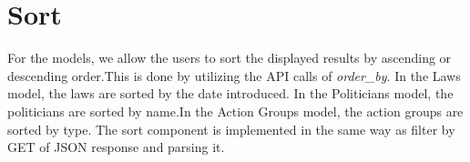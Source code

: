 \documentclass[12pt]{article}
\begin{document}
\section{Sort}

For the models, we allow the users to sort the displayed results by ascending or descending order.This is done by utilizing the API calls of \textit{order\_by}. In the Laws model, the laws are sorted by the date introduced. In the Politicians model, the politicians are sorted by name.In the Action Groups model, the action groups are sorted by type. The sort component is implemented in the same way as filter by GET of JSON response and parsing it.
\end{document}
